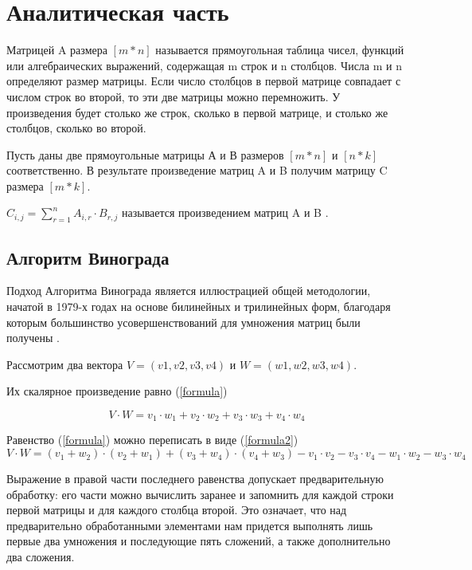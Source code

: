 \documentclass[12pt]{report}
\begin{document}
\chapter{Аналитическая часть}
Матрицей A размера $[m*n]$ называется прямоугольная таблица
чисел, функций или алгебраических выражений, содержащая m строк и n столбцов. Числа m и n определяют размер матрицы.\cite{Beloysov} Если число столбцов в первой матрице совпадает с числом строк во второй, то эти две матрицы можно перемножить. У произведения будет столько же строк, сколько в первой матрице, и столько же столбцов, сколько во второй.
	    
Пусть даны две прямоугольные матрицы А и В размеров $[m * n]$ и $[n * k]$ соответственно.  
В результате произведение матриц A и B получим матрицу C размера $[m *  k]$.

$C_{i,j} = \sum\limits_{r=1}^n A_{i,r}\cdot B_{r,j}$ называется произведением матриц A и B \cite{Beloysov}.


\section{Алгоритм Винограда}
Подход Алгоритма Винограда является иллюстрацией общей методологии, начатой в 1979-х годах на основе
билинейных и трилинейных форм, благодаря которым большинство усовершенствований для умножения матриц были получены \cite{Gall2012}.

Рассмотрим два вектора $V = (v1, v2, v3, v4)$ и $W = (w1, w2, w3, w4)$.  

 Их скалярное произведение равно (\ref{formula}) 

\begin{equation} \label{formula}
V \cdot W=v_1 \cdot w_1 + v_2 \cdot w_2 + v_3 \cdot w_3 + v_4 \cdot w_4
\end{equation}

Равенство (\ref{formula}) можно переписать в виде (\ref{formula2}) 
\begin{equation} \label{formula2}
V \cdot W=(v_1 + w_2) \cdot (v_2 + w_1) + (v_3 + w_4) \cdot (v_4 + w_3) - v_1 \cdot v_2 - v_3 \cdot v_4 - w_1 \cdot w_2 - w_3 \cdot w_4
\end{equation}

Выражение в правой части последнего равенства допускает предварительную обработку: его части можно вычислить заранее и запомнить для каждой строки первой матрицы и для каждого столбца второй. 
Это означает, что над предварительно обработанными элементами нам придется выполнять лишь первые два умножения и последующие пять сложений, а также дополнительно два сложения. 
\end{document}

